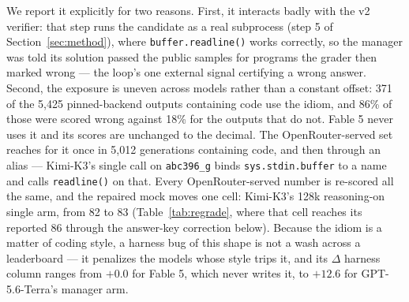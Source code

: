 \documentclass{article}
\begin{document}
We report it explicitly for two reasons. First, it interacts badly with the v2 verifier: that step
runs the candidate as a real subprocess (step 5 of Section~\ref{sec:method}), where
\texttt{buffer.readline()} works correctly, so the manager was told its solution passed the public
samples for programs the grader then marked wrong --- the loop's one external signal certifying a
wrong answer. Second, the exposure is uneven across models rather than a constant offset: 371 of the
5{,}425 pinned-backend outputs containing code use the idiom, and 86\% of those were scored wrong
against 18\% for the outputs that do not. Fable 5 never uses it and its scores are unchanged to the
decimal. The OpenRouter-served set reaches for it once in 5{,}012 generations containing code, and
then through an alias --- Kimi-K3's single call on \texttt{abc396\_g} binds
\texttt{sys.stdin.buffer} to a name and calls \texttt{readline()} on that. Every OpenRouter-served
number is re-scored all the same, and the repaired mock moves one cell: Kimi-K3's 128k
reasoning-on single arm, from 82 to 83 (Table~\ref{tab:regrade}, where that cell reaches its
reported 86 through the answer-key correction below). Because the idiom is a matter of coding
style, a harness bug of this shape is not a wash across a leaderboard --- it penalizes the models
whose style trips it, and its $\Delta$ harness column ranges from $+0.0$ for Fable 5, which
never writes it, to $+12.6$ for GPT-5.6-Terra's manager arm.
\end{document}
